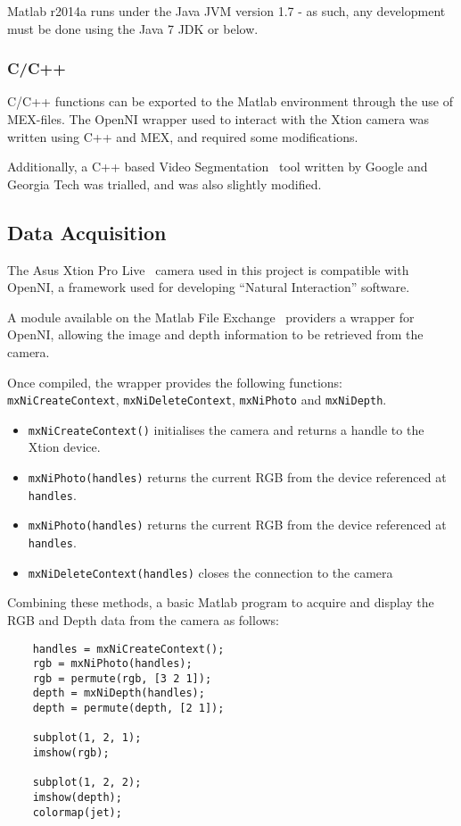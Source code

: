 Matlab r2014a runs under the Java JVM version 1.7 - as such, any development must be done using the Java 7 JDK or below. 

\subsubsection{C/C++}
C/C++ functions can be exported to the Matlab environment through the use of MEX-files. The OpenNI wrapper used to interact with the Xtion camera was written using C++ and MEX, and required some modifications.

Additionally, a C++ based Video Segmentation~\cite{videosegment} tool written by Google and Georgia Tech was trialled, and was also slightly modified.

\subsection{Data Acquisition}
The Asus Xtion Pro Live~\cite{xtion} camera used in this project is compatible with OpenNI, a framework used for developing ``Natural Interaction'' software.

A module available on the Matlab File Exchange~\cite{matlabwrapper} providers a wrapper for OpenNI, allowing the image and depth information to be retrieved from the camera.

Once compiled, the wrapper provides the following functions: \texttt{mxNiCreateContext}, \texttt{mxNiDeleteContext}, \texttt{mxNiPhoto} and \texttt{mxNiDepth}.

\begin{itemize}
    \item \texttt{mxNiCreateContext()} initialises the camera and returns a handle to the Xtion device.
    \item \texttt{mxNiPhoto(handles)} returns the current \ac{RGB} from the device referenced at \texttt{handles}.
    \item \texttt{mxNiPhoto(handles)} returns the current \ac{RGB} from the device referenced at \texttt{handles}.
    \item \texttt{mxNiDeleteContext(handles)} closes the connection to the camera 
\end{itemize}

Combining these methods, a basic Matlab program to acquire and display the RGB and Depth data from the camera as follows: 

\begin{verbatim}
    handles = mxNiCreateContext();
    rgb = mxNiPhoto(handles);
    rgb = permute(rgb, [3 2 1]);
    depth = mxNiDepth(handles);
    depth = permute(depth, [2 1]);

    subplot(1, 2, 1);
    imshow(rgb);

    subplot(1, 2, 2);
    imshow(depth);
    colormap(jet);
\end{verbatim}

